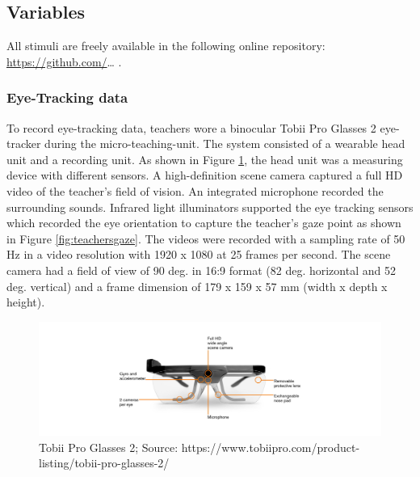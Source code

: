 \documentclass[
  man]{apa6}
\begin{document}
\hypertarget{variables}{%
\subsection{Variables}\label{variables}}

All stimuli are freely available in the following online repository: \url{https://github.com/}\ldots{} .

\hypertarget{eye-tracking-data}{%
\subsubsection{Eye-Tracking data}\label{eye-tracking-data}}

To record eye-tracking data, teachers wore a binocular Tobii Pro Glasses 2 eye-tracker during the micro-teaching-unit. The system consisted of a wearable head unit and a recording unit. As shown in Figure \ref{fig:tobiiglasses2}, the head unit was a measuring device with different sensors. A high-definition scene camera captured a full HD video of the teacher's field of vision. An integrated microphone recorded the surrounding sounds. Infrared light illuminators supported the eye tracking sensors which recorded the eye orientation to capture the teacher's gaze point as shown in Figure \ref{fig:teachersgaze}. The videos were recorded with a sampling rate of 50 Hz in a video resolution with 1920 x 1080 at 25 frames per second. The scene camera had a field of view of 90 deg. in 16:9 format (82 deg. horizontal and 52 deg. vertical) and a frame dimension of 179 x 159 x 57 mm (width x depth x height).

\begin{figure}

{\centering \includegraphics[width=14.07in]{./pictures/tobiiglasses2} 

}

\caption{Tobii Pro Glasses 2; Source: https://www.tobiipro.com/product-listing/tobii-pro-glasses-2/}\label{fig:tobiiglasses2}
\end{figure}
\end{document}
